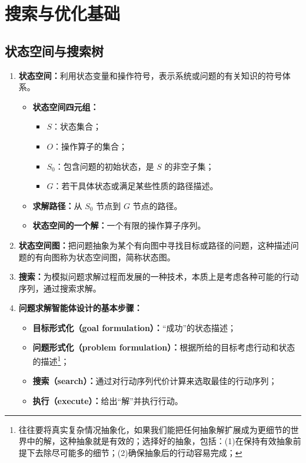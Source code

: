 \documentclass[../main.tex]{subfiles}
\begin{document}
\section{搜索与优化基础}\label{sec:search-optimization}
\subsection{状态空间与搜索树}\label{sec:state-space-search-tree}
\begin{enumerate}
    \item \textbf{状态空间：}利用状态变量和操作符号，表示系统或问题的有关知识的符号体系。
    \begin{itemize}
        \item \textbf{状态空间四元组：}
        \begin{itemize}
            \item $S$：状态集合；
            \item $O$：操作算子的集合；
            \item $S_0$：包含问题的初始状态，是 $S$ 的非空子集；
            \item $G$：若干具体状态或满足某些性质的路径描述。
        \end{itemize}
        \item \textbf{求解路径：}从 $S_0$ 节点到 $G$ 节点的路径。
        \item \textbf{状态空间的一个解：}一个有限的操作算子序列。
    \end{itemize}

    \item \textbf{状态空间图：}把问题抽象为某个有向图中寻找目标或路径的问题，这种描述问题的有向图称为状态空间图，简称状态图。

    \item \textbf{搜索：}为模拟问题求解过程而发展的一种技术，本质上是考虑各种可能的行动序列，通过搜索求解。

    \item \textbf{问题求解智能体设计的基本步骤：}
    \begin{itemize}
        \item \textbf{目标形式化（goal formulation）：}“成功”的状态描述；
        \item \textbf{问题形式化（problem formulation）：}根据所给的目标考虑行动和状态的描述\footnote{往往要将真实复杂情况抽象化，如果我们能把任何抽象解扩展成为更细节的世界中的解，这种抽象就是有效的；选择好的抽象，包括：(1)在保持有效抽象前提下去除尽可能多的细节；(2)确保抽象后的行动容易完成；}；
        \item \textbf{搜索（search）：}通过对行动序列代价计算来选取最佳的行动序列；
        \item \textbf{执行（execute）：}给出“解”并执行行动。
    \end{itemize}


\end{enumerate}
\end{document}
